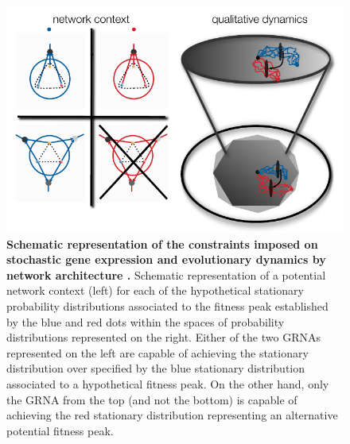 \begin{figure}[!ht]
\centering
\noindent\includegraphics[width=0.9\columnwidth]{fig/stochdynscheme.pdf}
\caption{{\bf Schematic representation of the constraints imposed on stochastic gene expression and evolutionary dynamics by network architecture .} Schematic representation of a potential network context (left) for each of the hypothetical stationary probability distributions associated to the fitness peak established by the blue and red dots within the spaces of probability distributions represented on the right. Either of the two GRNAs represented on the left are capable of achieving the stationary distribution over \gnpm{} specified by the blue stationary distribution associated to a hypothetical fitness peak. On the other hand, only the GRNA from the top (and not the bottom) is capable of achieving the red stationary distribution representing an alternative potential fitness peak.}
\label{fig:stochdynscheme}
\end{figure}
